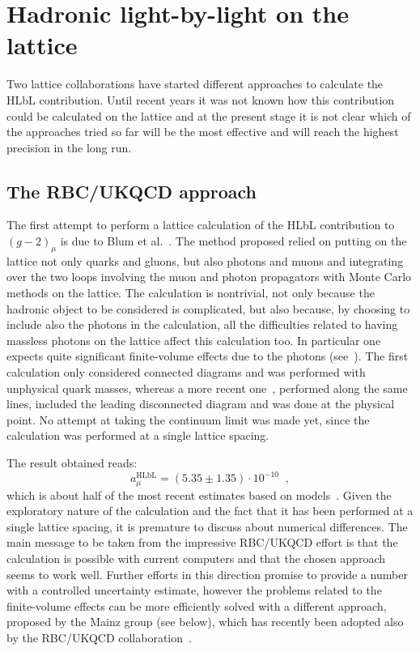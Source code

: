\documentclass[epj]{webofc}
\newcommand{\<}{\langle}
\renewcommand{\>}{\rangle}
\begin{document}
\section{Hadronic light-by-light on the lattice}\label{HLbl-lattice}

Two lattice collaborations have started different approaches to calculate
the HLbL contribution. Until recent years it was not known how this
contribution could be calculated on the lattice and at the present stage it
is not clear which of the approaches tried so far will be the most
effective and will reach the highest precision in the long run.

\subsection{The RBC/UKQCD approach}\label{sec:latticeRBC}
The first attempt to perform a lattice calculation of the HLbL contribution
to $(g-2)_\mu$ is due to Blum et al.~\cite{Blum:2014oka}. The method
proposed relied on putting on the lattice not only quarks and gluons, but
also photons and muons and integrating over the two loops involving the
muon and photon propagators with Monte Carlo methods on the lattice. The
calculation is nontrivial, not only because the hadronic object to be
considered is complicated, but also because, by choosing to include also
the photons in the calculation, all the difficulties related to having
massless photons on the lattice affect this calculation too. In particular
one expects quite significant finite-volume effects due to the photons
(see~\cite{IzubuchiLat17}). The 
first calculation only considered connected diagrams and was performed with
unphysical quark masses, whereas a more recent one~\cite{Blum:2016lnc,BlumLat17},
performed along the same lines, included the leading disconnected diagram
and was done at the physical point. No attempt at taking the continuum
limit was made yet, since the calculation was performed at a single lattice
spacing. 

The result obtained reads:
\begin{equation}
a_\mu^\mathrm{HLbL}=(5.35 \pm  1.35) \cdot 10^{-10} \; \;,
\end{equation}
which is about half of the most recent estimates based on
models~\cite{Prades:2009tw,Jegerlehner:2009ry}. Given the exploratory
nature of the calculation and the fact that it has been performed at a
single lattice spacing, it is premature to discuss about numerical 
differences. The main message to be taken from the impressive RBC/UKQCD 
effort is that the calculation is possible with current computers and that 
the chosen approach seems to work well. Further efforts in this direction
promise to provide a number with a controlled uncertainty estimate, however
the problems related to the finite-volume effects can be more efficiently
solved with a different approach, proposed by the Mainz group (see below),
which has recently been adopted also by the RBC/UKQCD
collaboration~\cite{Blum:2017cer}. 
\end{document}
